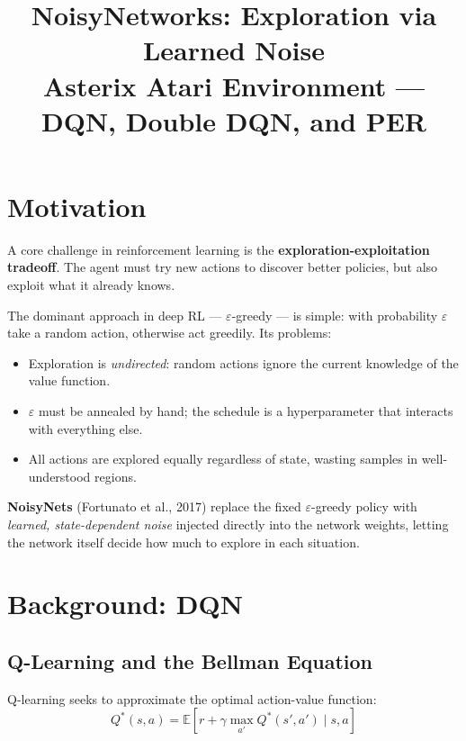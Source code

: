 \documentclass[12pt]{article}
\title{\textbf{NoisyNetworks: Exploration via Learned Noise}\\
\large Asterix Atari Environment --- DQN, Double DQN, and PER}
\author{}
\date{}
\begin{document}
\maketitle
\tableofcontents
\newpage

\section{Motivation}

A core challenge in reinforcement learning is the \textbf{exploration-exploitation tradeoff}.
The agent must try new actions to discover better policies, but also exploit what it already knows.

The dominant approach in deep RL --- $\varepsilon$-greedy --- is simple: with probability
$\varepsilon$ take a random action, otherwise act greedily.
Its problems:
\begin{itemize}
  \item Exploration is \emph{undirected}: random actions ignore the current knowledge of the value function.
  \item $\varepsilon$ must be annealed by hand; the schedule is a hyperparameter that interacts with everything else.
  \item All actions are explored equally regardless of state, wasting samples in well-understood regions.
\end{itemize}

\textbf{NoisyNets} (Fortunato et al., 2017) replace the fixed $\varepsilon$-greedy policy with
\emph{learned, state-dependent noise} injected directly into the network weights,
letting the network itself decide how much to explore in each situation.

\section{Background: DQN}

\subsection{Q-Learning and the Bellman Equation}

Q-learning seeks to approximate the optimal action-value function:
\begin{equation}
  Q^*(s, a) = \mathbb{E}\!\left[r + \gamma \max_{a'} Q^*(s', a') \;\Big|\; s, a\right]
\end{equation}
\end{document}
